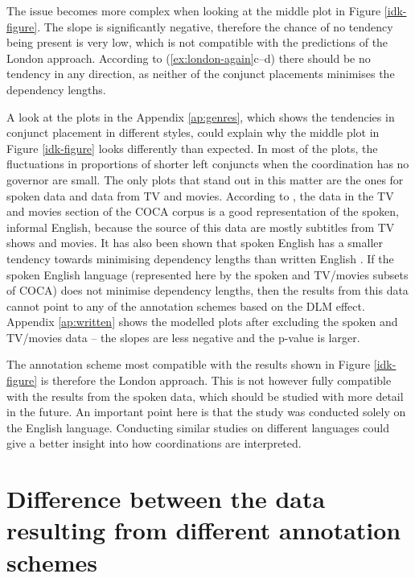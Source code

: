 The issue becomes more complex when looking at the middle plot in Figure \ref{idk-figure}. The slope is significantly negative, therefore the chance of no tendency being present is very low, which is not compatible with the predictions of the London approach. According to (\ref{ex:london-again}c--d) there should be no tendency in any direction, as neither of the conjunct placements minimises the dependency lengths. 


\vspace{6ex}

A look at the plots in the Appendix \ref{ap:genres}, which shows the tendencies in conjunct placement in different styles, could explain why the middle plot in Figure \ref{idk-figure} looks differently than expected. In most of the plots, the fluctuations in proportions of shorter left conjuncts when the coordination has no governor are small. The only plots that stand out in this matter are the ones for spoken data and data from TV and movies. According to \cite{davies-tvm}, the data in the TV and movies section of the COCA corpus is a good representation of the spoken, informal English, because the source of this data are mostly subtitles from TV shows and movies. It has also been shown that spoken English has a smaller tendency towards minimising dependency lengths than written English \citep{liu-2019-comparative}. If the spoken English language (represented here by the spoken and TV/movies subsets of COCA) does not minimise dependency lengths, then the results from this data cannot point to any of the annotation schemes based on the DLM effect. Appendix \ref{ap:written} shows the modelled plots after excluding the spoken and TV/movies data -- the slopes are less negative and the p-value is larger. 

The annotation scheme most compatible with the results shown in Figure \ref{idk-figure} is therefore the London approach. This is not however fully compatible with the results from the spoken data, which should be studied with more detail in the future. An important point here is that the study was conducted solely on the English language. Conducting similar studies on different languages could give a better insight into how coordinations are interpreted. 

\section{Difference between the data resulting from different annotation schemes}

